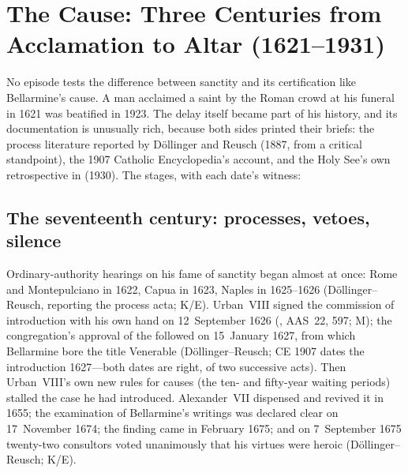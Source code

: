 \section{The Cause: Three Centuries from Acclamation to Altar
(1621--1931)}
\label{sec:cause}

No episode tests the difference between sanctity and its
certification like Bellarmine's cause. A man acclaimed a saint by
the Roman crowd at his funeral in 1621 was beatified in 1923. The
delay itself became part of his history, and its documentation is
unusually rich, because both sides printed their briefs: the
process literature reported by D\"ollinger and Reusch (1887, from
a critical standpoint), the 1907 Catholic Encyclopedia's
account, and the Holy See's own retrospective in 
(1930). The stages, with each date's witness:

\subsection{The seventeenth century: processes, vetoes, silence}

Ordinary-authority hearings on his fame of sanctity began almost
at once: Rome and Montepulciano in 1622, Capua in 1623, Naples in
1625--1626 (D\"ollinger--Reusch, reporting the process acta; K/E).
Urban~VIII signed the commission of introduction with his own
hand on 12~September 1626 (, AAS~22, 597; M);
the congregation's approval of the 
followed on 15~January 1627, from which Bellarmine bore the title
Venerable (D\"ollinger--Reusch; CE 1907 dates the introduction
1627---both dates are right, of two successive acts). Then
Urban~VIII's own new rules for causes (the ten- and fifty-year
waiting periods) stalled the case he had introduced.
Alexander~VII dispensed and revived it in 1655; the examination
of Bellarmine's writings was declared clear on 17~November 1674;
the  finding came in February 1675; and on
7~September 1675 twenty-two consultors voted unanimously that his
virtues were heroic (D\"ollinger--Reusch; K/E).

